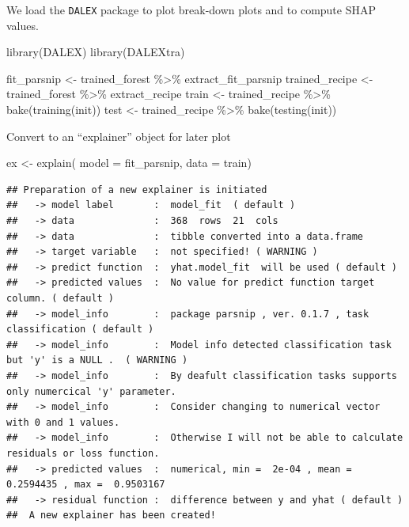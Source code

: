 \documentclass[
]{article}
\newenvironment{Shaded}{\begin{snugshade}}{\end{snugshade}}
\newcommand{\AttributeTok}[1]{\textcolor[rgb]{0.77,0.63,0.00}{#1}}
\newcommand{\FunctionTok}[1]{\textcolor[rgb]{0.00,0.00,0.00}{#1}}
\newcommand{\NormalTok}[1]{#1}
\newcommand{\OtherTok}[1]{\textcolor[rgb]{0.56,0.35,0.01}{#1}}
\newcommand{\SpecialCharTok}[1]{\textcolor[rgb]{0.00,0.00,0.00}{#1}}
\begin{document}
We load the \texttt{DALEX} package to plot break-down plots and to
compute SHAP values.

\begin{Shaded}
\begin{Highlighting}[]
\FunctionTok{library}\NormalTok{(DALEX)}
\FunctionTok{library}\NormalTok{(DALEXtra)}
\end{Highlighting}
\end{Shaded}

\begin{Shaded}
\begin{Highlighting}[]
\NormalTok{fit\_parsnip }\OtherTok{\textless{}{-}}\NormalTok{ trained\_forest }\SpecialCharTok{\%\textgreater{}\%}\NormalTok{ extract\_fit\_parsnip}
\NormalTok{trained\_recipe }\OtherTok{\textless{}{-}}\NormalTok{ trained\_forest }\SpecialCharTok{\%\textgreater{}\%}\NormalTok{ extract\_recipe}
\NormalTok{train }\OtherTok{\textless{}{-}}\NormalTok{ trained\_recipe }\SpecialCharTok{\%\textgreater{}\%} \FunctionTok{bake}\NormalTok{(}\FunctionTok{training}\NormalTok{(init))}
\NormalTok{test }\OtherTok{\textless{}{-}}\NormalTok{ trained\_recipe }\SpecialCharTok{\%\textgreater{}\%} \FunctionTok{bake}\NormalTok{(}\FunctionTok{testing}\NormalTok{(init))}
\end{Highlighting}
\end{Shaded}

Convert to an ``explainer'' object for later plot

\begin{Shaded}
\begin{Highlighting}[]
\NormalTok{ex }\OtherTok{\textless{}{-}}
  \FunctionTok{explain}\NormalTok{(}
    \AttributeTok{model =}\NormalTok{ fit\_parsnip,}
    \AttributeTok{data =}\NormalTok{ train)}
\end{Highlighting}
\end{Shaded}

\begin{verbatim}
## Preparation of a new explainer is initiated
##   -> model label       :  model_fit  ( default )
##   -> data              :  368  rows  21  cols 
##   -> data              :  tibble converted into a data.frame 
##   -> target variable   :  not specified! ( WARNING )
##   -> predict function  :  yhat.model_fit  will be used ( default )
##   -> predicted values  :  No value for predict function target column. ( default )
##   -> model_info        :  package parsnip , ver. 0.1.7 , task classification ( default ) 
##   -> model_info        :  Model info detected classification task but 'y' is a NULL .  ( WARNING )
##   -> model_info        :  By deafult classification tasks supports only numercical 'y' parameter. 
##   -> model_info        :  Consider changing to numerical vector with 0 and 1 values.
##   -> model_info        :  Otherwise I will not be able to calculate residuals or loss function.
##   -> predicted values  :  numerical, min =  2e-04 , mean =  0.2594435 , max =  0.9503167  
##   -> residual function :  difference between y and yhat ( default )
##  A new explainer has been created! 
\end{verbatim}
\end{document}
